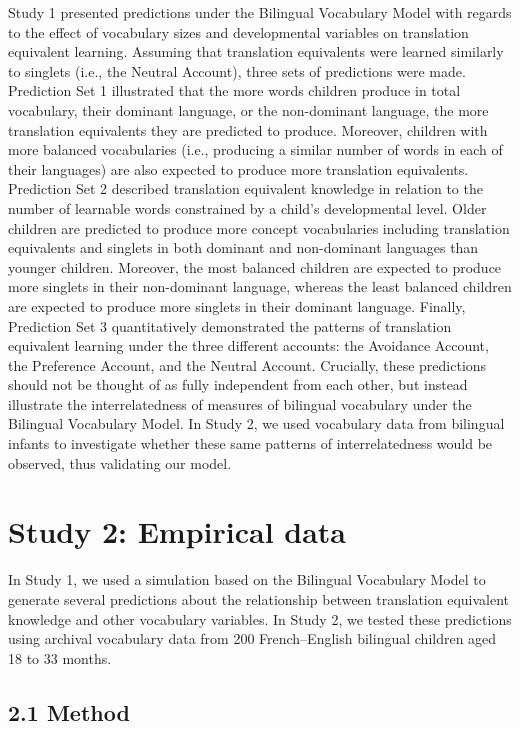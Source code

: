 \documentclass[
  english,
  ,man,floatsintext]{apa6}
\begin{document}
Study 1 presented predictions under the Bilingual Vocabulary Model with regards to the effect of vocabulary sizes and developmental variables on translation equivalent learning. Assuming that translation equivalents were learned similarly to singlets (i.e., the Neutral Account), three sets of predictions were made. Prediction Set 1 illustrated that the more words children produce in total vocabulary, their dominant language, or the non-dominant language, the more translation equivalents they are predicted to produce. Moreover, children with more balanced vocabularies (i.e., producing a similar number of words in each of their languages) are also expected to produce more translation equivalents. Prediction Set 2 described translation equivalent knowledge in relation to the number of learnable words constrained by a child's developmental level. Older children are predicted to produce more concept vocabularies including translation equivalents and singlets in both dominant and non-dominant languages than younger children. Moreover, the most balanced children are expected to produce more singlets in their non-dominant language, whereas the least balanced children are expected to produce more singlets in their dominant language. Finally, Prediction Set 3 quantitatively demonstrated the patterns of translation equivalent learning under the three different accounts: the Avoidance Account, the Preference Account, and the Neutral Account. Crucially, these predictions should not be thought of as fully independent from each other, but instead illustrate the interrelatedness of measures of bilingual vocabulary under the Bilingual Vocabulary Model. In Study 2, we used vocabulary data from bilingual infants to investigate whether these same patterns of interrelatedness would be observed, thus validating our model.

\hypertarget{study-2-empirical-data}{%
\section{Study 2: Empirical data}\label{study-2-empirical-data}}

In Study 1, we used a simulation based on the Bilingual Vocabulary Model to generate several predictions about the relationship between translation equivalent knowledge and other vocabulary variables. In Study 2, we tested these predictions using archival vocabulary data from 200 French--English bilingual children aged 18 to 33 months.

\hypertarget{method}{%
\subsection{2.1 Method}\label{method}}
\end{document}
